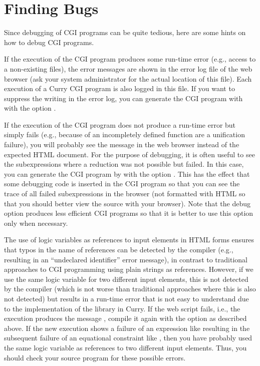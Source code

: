 \section{Finding Bugs}

Since debugging of CGI programs can be quite tedious,
here are some hints on how to debug CGI programs.

If the execution of the CGI program produces some run-time error
(e.g., access to a non-existing files), the error messages
are shown in the error log file of the web browser (ask your system
administrator for the actual location of this file).
Each execution of a Curry CGI program is also logged in this file.
If you want to suppress the writing in the error log,
you can generate the CGI program with 
with the option .

If the execution of the CGI program does not produce a run-time error
but simply fails (e.g., because of an incompletely defined function
are a unification failure), you will probably see the message
 in the web browser instead of the
expected HTML document. For the purpose of debugging,
it is often useful to see the subexpressions where a
reduction was not possible but failed. In this case,
you can  generate the CGI program by 
with the option .
This has the effect that some debugging code is inserted in the CGI
program so that you can see the trace of all failed subexpressions
in the browser (not formatted with HTML so that you should better
view the source with your browser). Note that the debug option
produces less efficient CGI programs so that it is better to
use this option only when necessary.

The use of logic variables as references to input elements
in HTML forms ensures that typos in the name of references
can be detected by the compiler (e.g., resulting in an
``undeclared identifier'' error message), in contrast
to traditional approaches to CGI programming using plain strings
as references.
However, if we use the same logic variable for two different
input elements, this is not detected by the compiler
(which is not worse than traditional approaches where this
is also not detected) but results in a run-time error
that is not easy to understand due to the implementation
of the  library in Curry.
If the web script fails, i.e., the execution produces the message
, compile it again with
the option  as described above.
If the new execution shows a failure of an expression
like  resulting in the subsequent failure of an
equational constraint like ,
then you have probably used the same logic variable
as references to two different input elements.
Thus, you should check your source program for these possible errors.


